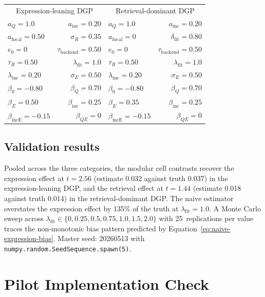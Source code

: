 \documentclass[11pt]{article}
\begin{document}
\begin{tabular}{lr@{\hskip 24pt}lr}
\toprule
\multicolumn{2}{c}{Expression-leaning DGP} & \multicolumn{2}{c}{Retrieval-dominant DGP} \\
$a_Q = 1.0$ & $a_{\mathrm{inc}} = 0.20$ & $a_Q = 1.0$ & $a_{\mathrm{inc}} = 0.20$ \\
$a_{\mathrm{focal}} = 0.50$ & $\sigma_R = 0.35$ & $a_{\mathrm{focal}} = 0$ & $\delta_{\mathrm{fit}} = 0.80$ \\
$e_0 = 0$ & $\tau_{\mathrm{backend}} = 0.50$ & $e_0 = 0$ & $\tau_{\mathrm{backend}} = 0.50$ \\
$\tau_R = 0.50$ & $\lambda_{\mathrm{fit}} = 1.0$ & $\tau_R = 0.50$ & $\lambda_{\mathrm{fit}} = 1.0$ \\
$\lambda_{\mathrm{inc}} = 0.20$ & $\sigma_E = 0.50$ & $\lambda_{\mathrm{inc}} = 0.20$ & $\sigma_E = 0.50$ \\
$\beta_0 = -0.80$ & $\beta_Q = 0.70$ & $\beta_0 = -0.80$ & $\beta_Q = 0.70$ \\
$\beta_E = 0.50$ & $\beta_{\mathrm{inc}} = 0.25$ & $\beta_E = 0.35$ & $\beta_{\mathrm{inc}} = 0.25$ \\
$\beta_{\mathrm{incE}} = -0.15$ & $\beta_{QE} = 0$ & $\beta_{\mathrm{incE}} = -0.15$ & $\beta_{QE} = 0$ \\
\bottomrule
\end{tabular}

\subsection{Validation results}

Pooled across the three categories, the modular cell contrasts recover the expression effect at $t = 2.56$ (estimate 0.032 against truth 0.037) in the expression-leaning DGP, and the retrieval effect at $t = 1.44$ (estimate 0.018 against truth 0.014) in the retrieval-dominant DGP. The naive estimator overstates the expression effect by 135\% of the truth at $\lambda_{\mathrm{fit}} = 1.0$. A Monte Carlo sweep across $\lambda_{\mathrm{fit}} \in \{0, 0.25, 0.5, 0.75, 1.0, 1.5, 2.0\}$ with 25~replications per value traces the non-monotonic bias pattern predicted by Equation~\eqref{eq:naive-expression-bias}. Master seed: 20260513 with \texttt{numpy.random.SeedSequence.spawn(5)}.

\section{Pilot Implementation Check}\label{section:pilot}
\end{document}

